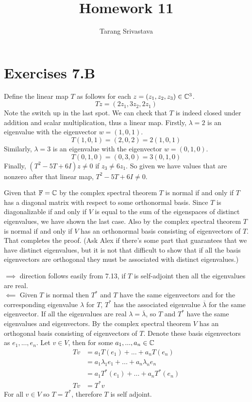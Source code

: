 \documentclass[10pt, twocolumn]{article}
\title{Homework 11}
\author{Tarang Srivastava}
\begin{document}
\makechaptertitle

\section{Exercises 7.B}

\begin{q}[3]
    Define the linear map $ T $ as follows for each $ z = (z_1, z_2, z_3) \in \mathbb{C}^3 $.
    $$ Tz = (2z_1, 3z_2, 2z_1) $$
    Note the switch up in the last spot. 
    We can check that $ T $ is indeed closed under addition and scalar multiplication, thus a linear map.
    Firstly, $ \lambda = 2 $ is an eigenvalue with the eigenvector $ w = (1, 0, 1) $.
    $$ T(1, 0, 1) = (2, 0, 2) = 2(1, 0, 1) $$
    Similarly, $ \lambda = 3 $ is an eigenvalue with the eigenvector $ w = (0, 1, 0) $.
    $$ T(0, 1, 0) = (0, 3, 0) = 3(0, 1, 0) $$
    Finally, $ (T^2 - 5T + 6I)z \neq 0 $ if $ z_3 \neq 6 z_1 $. 
    So given we have values that are nonzero after that linear map, $ T^2 - 5T + 6I \neq 0 $.
\end{q}

\begin{q}[4]
    Given that $ \mathbb{F} = \mathbb{C} $ by the complex spectral theorem $ T $ is normal if and only if $ T $ has a diagonal matrix with respect to some orthonormal basis.
    Since $ T $ is diagonalizable if and only if $ V $ is equal to the sum of the eigenspaces of distinct eigenvalues, we have shown the last case.
    Also by the complex spectral theorem $ T $ is normal if and only if $ V $ has an orthonormal basis consisting of eigenvectors of $ T $.
    That completes the proof. 
    (Ask Alex if there's some part that guarantees that we have distinct eigenvalues, but it is not that difficult to show that if all the basis eigenvectors are orthogonal they must be associated with distinct eigenvalues.)
\end{q}

\begin{q}[6]
    $ \implies $ direction follows easily from 7.13, if $ T $ is self-adjoint then all the eigenvalues are real. \\
    $ \impliedby $ Given $ T $ is normal then $ T^* $ and $ T $ have the same eigenvectors 
    and for the corresponding eigenvalue $ \lambda $ for $ T $, $ T ^* $ has the associated eigenvalue $ \overline{\lambda} $ for the same eigenvector.
    If all the eigenvalues are real $ \lambda = \overline{\lambda} $, so $ T $ and $ T^* $ have the same eigenvalues and eigenvectors.
    By the complex spectral theorem $ V $ has an orthogonal basis consisting of eigenvectors of $ T $.
    Denote these basis eigenvectors as $ e_1, ..., e_n $.
    Let $ v \in V $, then for some $ a_1, ..., a_n \in \mathbb{C} $
    \begin{align*}
    Tv &= a_1T(e_1) + ... + a_n T(e_n) \\
    &= a_1 \lambda_1 e_1 + ... + a_n \lambda_n e_n \\
    &= a_1T^*(e_1) + ... + a_n T^*(e_n) \\
    Tv &= T^*v
    \end{align*}
    For all $ v \in V $ so $ T = T^* $, therefore $ T $ is self adjoint.
\end{q}
\end{document}
